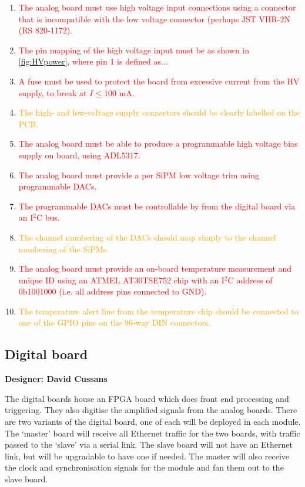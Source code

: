 \documentclass[a4paper]{article}
\newcommand{\must}[1]{\textcolor{red}{#1}}
\newcommand{\should}[1]{\textcolor{orange}{#1}}
\def\I2C{I$^2$C}
\begin{document}
\begin{enumerate}
    \item \must{The analog board must use high voltage input connections using a connector that is incompatible with the low voltage connector (perhaps JST VHR-2N (RS 820-1172).}
    \item \must{The pin mapping of the high voltage input must be as shown in \cref{fig:HVpower}, where pin 1 is defined as...}
    \item \must{A fuse must be used to protect the board from excessive current from the HV supply, to break at $I \le 100$ mA.}
    \item \should{The high- and low-voltage supply connectors should be clearly labelled on the PCB.}
    \item \must{The analog board must be able to produce a programmable high voltage bias supply on board, using ADL5317.}
    \item \must{The analog board must provide a per SiPM low voltage trim using programmable DACs.}
    \item \must{The programmable DACs must be controllable by from the digital board via an \I2C bus.}
    \item \should{The channel numbering of the DACs should map simply to the channel numbering of the SiPMs.}
    \item \must{The analog board must provide an on-board temperature measurement and unique ID using an ATMEL AT30TSE752 chip with an \I2C address of 0b1001000 (i.e. all address pins connected to GND).} 
    \item \should{The temperature alert line from the temperature chip should be connected to one of the GPIO pins on the 96-way DIN connectors.}
\end{enumerate}

\clearpage
\newpage

\subsection{Digital board}

{\bf Designer: David Cussans}

The digital boards house an FPGA board which does front end processing and triggering.
They also digitise the amplified signals from the analog boards.
There are two variants of the digital board, one of each will be deployed in each module.
The `master' board will receive all Ethernet traffic for the two boards, with traffic passed to the `slave' via a serial link.
The slave board will not have an Ethernet link, but will be upgradable to have one if needed.
The master will also receive the clock and synchronisation signals for the module and fan them out to the slave board.
\end{document}
